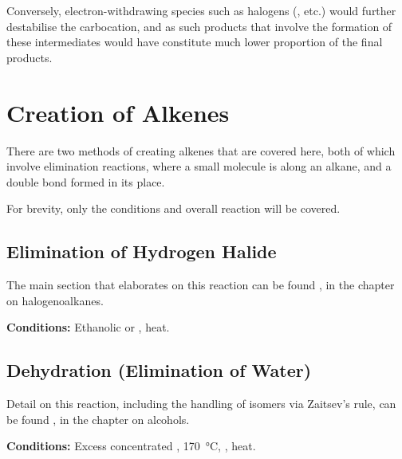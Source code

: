 			Conversely, electron-withdrawing species such as halogens (, \ch{\Cl} etc.) would further destabilise
			the carbocation, and as such products that involve the formation of these intermediates would have constitute much
			lower proportion of the final products.


	\pagebreak
	\section{Creation of Alkenes}

		There are two methods of creating alkenes that are covered here, both of which involve elimination reactions, where a small
		molecule is  along an alkane, and a double bond formed in its place.

		For brevity, only the conditions and overall reaction will be covered.

		\subsection{Elimination of Hydrogen Halide}

			The main section that elaborates on this reaction can be found \hyperlink{HydrogenHalideElimination}{}, in the
			chapter on halogenoalkanes.


			\vspace{1.5em}
			\vbox{\textbf{Conditions:}	\tabto{35mm}Ethanolic  or , heat.}




		\subsection{Dehydration (Elimination of Water)}

			Detail on this reaction, including the handling of isomers via Zaitsev's rule, can be found
			\hyperlink{AlcoholDehydration}{}, in the chapter on alcohols.


			\vspace{1.5em}
			\vbox{\textbf{Conditions:}	\tabto{35mm}Excess concentrated , \SI{170}{\celsius}, 
										\tabto{35mm}, heat.}

